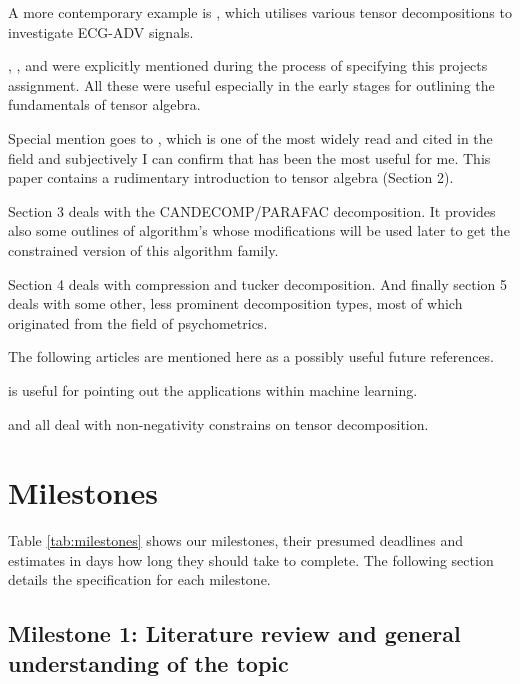 \documentclass{article}
\begin{document}
A more contemporary example is \cite{almirantearena2017decomposition}, which utilises various tensor decompositions to investigate ECG-ADV signals.

\cite{zhou2014nonnegative}, \cite{cichocki2015tensor}, \cite{kolda2009tensor} and \cite{yokota2015smooth} were explicitly mentioned during the process of specifying this projects assignment. All these were useful especially in the early stages for outlining the fundamentals of tensor algebra. 

Special mention goes to \cite{kolda2009tensor}, which is one of the most widely read and cited in the field and subjectively I can confirm that has been the most useful for me. This paper contains a rudimentary introduction to tensor algebra (Section 2).

Section 3 deals with the CANDECOMP/PARAFAC decomposition. It provides also some outlines of algorithm's whose modifications will be used later to get the constrained version of this algorithm family.

Section 4 deals with compression and tucker decomposition. And finally section 5 deals with some other, less prominent decomposition types, most of which originated from the field of psychometrics.

The following articles are mentioned here as a possibly useful future references.

\cite{sidiropoulos2017tensor} is useful for pointing out the applications within machine learning.

 \cite{ballard2018parallel} and \cite{friedlander2008computing} all deal with non-negativity constrains on tensor decomposition.


\section{Milestones \label{sec:milestones}}

Table \ref{tab:milestones} shows our milestones, their presumed deadlines and estimates in days how long they should take to complete. The following section details the specification for each milestone.

\subsection{Milestone 1: Literature review and general understanding of the topic}
\end{document}
